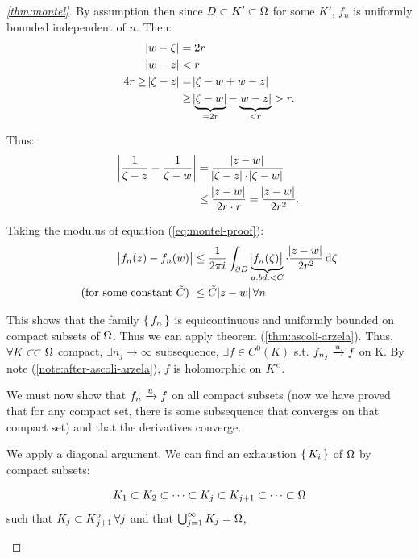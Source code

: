 \begin{proof}[\ref{thm:montel}]
By assumption then since $D\subset K' \subset \om$ for some $K'$, $f_n$ is uniformly bounded independent of $n$. Then:
\begin{align*}
    \abs{w-\zeta} &= 2r\\
    \abs{w-z} &< r\\
    4r \geq \abs{\zeta - z} &= \abs{\zeta - w + w -z}\\
    &\geq  \underbrace{\abs{\zeta - w}}_{=2r} - \underbrace{\abs{w-z}}_{<r} > r.
\end{align*}

Thus:
\begin{align*}
    \abs{\frac{1}{\zeta - z} - \frac{1}{\zeta - w}} &= \frac{\abs{z-w}}{\abs{\zeta-z} \cdot \abs{\zeta-w}}\\
    &\leq \frac{\abs{z-w}}{2r\cdot r} = \frac{\abs{z-w}}{2r^2}.
\end{align*}

Taking the modulus of equation (\ref{eq:montel-proof}):
\begin{align*}
    \abs{f_n(z) - f_n(w)} &\leq \frac{1}{2 \pi i} \int_{\partial D} \underbrace{\abs{f_n(\zeta) }}_{u.bd. <C} \cdot \frac{\abs{z-w}}{2r^2} \dif \zeta\\
    \text{(for some constant $\Tilde{C}$) }& \leq \Tilde{C} \abs{z-w} \forall n
\end{align*}

This shows that the family $\set{ f_n } $ is equicontinuous and uniformly bounded on compact subsets of $\om$. Thus we can apply theorem (\ref{thm:ascoli-arzela}). Thus, $\forall K \ssubset \om$ compact, $\exists n_j \to \infty$ subsequence, $\exists f \in C^0 (K) $ s.t. $f_{n_j} \tou f$ on K. By note (\ref{note:after-ascoli-arzela}), $f$ is holomorphic on $\interior{K}$.

We must now show that $f_n \tou f$ on all compact subsets (now we have proved that for any compact set, there is some subsequence that converges on that compact set) and that the derivatives converge.

We apply a diagonal argument. We can find an exhaustion $\set{ K_i }$ of $\om$ by compact subsets:

\begin{align*}
    K_1 \subset K_2 \subset \cdots \subset K_j \subset K_{j+1} \subset \cdots \subset \om
\end{align*}
such that $K_j \subset \interior{K}_{j+1} \, \forall j$ and that $\bigcup_{j=1}^\infty K_j = \om$,



\begin{center}
    \begin{tikzpicture}
    

\end{tikzpicture}
\end{center}
\end{proof}
